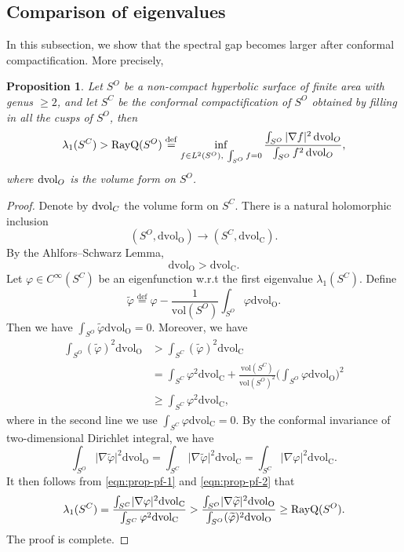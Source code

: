 \documentclass{amsart}
\newcommand{\abs}[1]{\lvert #1 \rvert}
\newcommand{\dvol}{d\mathit{vol}}
\def\dvol{\mathop{\rm dvol}}
\theoremstyle{plain}
\newtheorem{proposition}[theorem]{Proposition}
\theoremstyle{definition}
\theoremstyle{remark}
\begin{document}
\subsection{Comparison of eigenvalues}
In this subsection, we show that the spectral gap becomes larger after conformal compactification.  More precisely,
\begin{proposition}\label{p-compare}
    Let $S^O$ be a non-compact hyperbolic surface of finite area with genus $\geq 2$, and let $S^C$ be the conformal compactification of $S^O$ obtained by filling in all the cusps of $S^O$, then 
    \[ \lambda_1(S^C) > \textnormal{RayQ}(S^O)\overset{\mathrm{def}}{=}\inf\limits_{f\in L^2(S^O),\ \int_{S^O}f=0}\frac{\int_{S^O} |\nabla f|^2\dvol_O}{\int_{S^O} f^2\dvol_O}, \] 
    where $\dvol_O$ is the volume form on $S^O$.
\end{proposition}
\begin{proof}
    Denote by $\dvol_C$ the volume form on $S^C$. There is a natural holomorphic inclusion 
    \[ (S^O,\mathrm{dvol_O}) \to (S^C,\mathrm{dvol_C}). \] 
    By the Ahlfors--Schwarz Lemma, 
    \[ \mathrm{dvol_O} > \mathrm{dvol_C}. \] 
    Let $\varphi\in C^\infty(S^C)$ be an eigenfunction w.r.t the first eigenvalue $\lambda_1(S^C)$. Define 
    \[ \widetilde{\varphi} \overset{\mathrm{def}}{=}\varphi - \frac{1}{\mathrm{vol}(S^O)}\int_{S^O}\varphi\mathrm{dvol_O}. \] 
    Then we have $\int_{S^O}\widetilde{\varphi}\mathrm{dvol_O}=0$. Moreover, we have 
    \begin{equation}\label{eqn:prop-pf-1}
        \begin{aligned}
            \int_{S^O}(\widetilde{\varphi})^2 \mathrm{dvol_O} 
            &> \int_{S^C}(\widetilde{\varphi})^2 \mathrm{dvol_C}\\
            &  =  \int_{S^C}\varphi^2 \mathrm{dvol_C} + \frac{\mathrm{vol}(S^C)}{\mathrm{vol}(S^O)^2}\Big( \int_{S^O}\varphi \mathrm{dvol_O} \Big)^2\\
            &\geq \int_{S^C}\varphi^2 \mathrm{dvol_C}, 
        \end{aligned}
    \end{equation}
    where in the second line we use $\int_{S^C}\varphi\mathrm{dvol_C}=0$. 
    By the conformal invariance of two-dimensional Dirichlet integral, we have 
    \begin{equation}\label{eqn:prop-pf-2}
        \int_{S^O}\abs{\nabla \widetilde{\varphi}}^2 \mathrm{dvol_O} = \int_{S^C}\abs{\nabla \widetilde{\varphi}}^2 \mathrm{dvol_C} = \int_{S^C}\abs{\nabla \varphi}^2 \mathrm{dvol_C}.
    \end{equation}
    It then follows from \eqref{eqn:prop-pf-1} and \eqref{eqn:prop-pf-2} that 
    \begin{equation*}
        \lambda_1(S^C) = \frac{\int_{S^C}\abs{\nabla\varphi}^2\mathrm{dvol_C}}{\int_{S^C}\varphi^2\mathrm{dvol_C}} >\frac{\int_{S^O}\abs{\nabla\widetilde{\varphi}}^2\mathrm{dvol_O}}{\int_{S^O}(\widetilde{\varphi})^2\mathrm{dvol_O}} \geq \textnormal{RayQ}(S^O).
    \end{equation*}
    The proof is complete. 
\end{proof}
\end{document}
